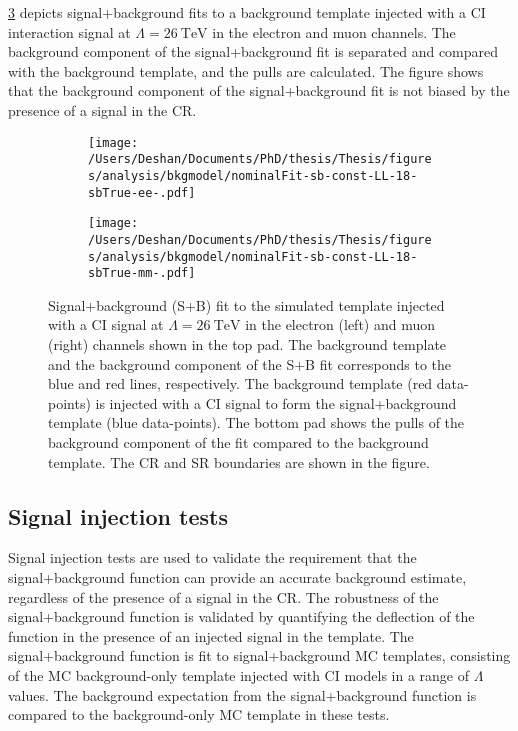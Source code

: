 \cref{fig:bkgmodel:sbfits} depicts signal+background fits to a background template injected with a CI interaction signal at $\Lambda = \SI{26}{\tera\electronvolt}$ in the electron and muon channels. The background component of the signal+background fit is separated and compared with the background template, and the pulls are calculated. The figure shows that the background component of the signal+background fit is not biased by the presence of a signal in the CR. 
\begin{figure}[h!]
    \centering
    \begin{subfigure}[b]{0.49\textwidth}
        \centering
        \texttt{[image: /Users/Deshan/Documents/PhD/thesis/Thesis/figures/analysis/bkgmodel/nominalFit-sb-const-LL-18-sbTrue-ee-.pdf]}
        \label{fig:bkgmodel:sbfits1}
    \end{subfigure}
    \begin{subfigure}[b]{0.49\textwidth}
        \centering
        \texttt{[image: /Users/Deshan/Documents/PhD/thesis/Thesis/figures/analysis/bkgmodel/nominalFit-sb-const-LL-18-sbTrue-mm-.pdf]}
        \label{fig:bkgmodel:sbfits2}
    \end{subfigure}
    \caption[Signal+Background fits to the signal+background template in the electron and muon channels]{Signal+background (S+B) fit to the simulated template injected with a CI signal at $\Lambda = \SI{26}{\tera\electronvolt}$ in the electron (left) and muon (right) channels shown in the top pad. The background template and the background component of the S+B fit corresponds to the blue and red lines, respectively. The background template (red data-points) is injected with a CI signal to form the signal+background template (blue data-points). The bottom pad shows the pulls of the background component of the fit compared to the background template. The CR and SR boundaries are shown in the figure.}
    \label{fig:bkgmodel:sbfits}
\end{figure}

\subsection{Signal injection tests}\label{sec:extrap:recovery}
Signal injection tests are used to validate the requirement that the signal+background function can provide an accurate background estimate, regardless of the presence of a signal in the CR. The robustness of the signal+background function is validated by quantifying the deflection of the function in the presence of an injected signal in the template. The signal+background function is fit to signal+background MC templates, consisting of the MC background-only template injected with CI models in a range of $\Lambda$ values. The background expectation from the signal+background function is compared to the background-only MC template in these tests. 

